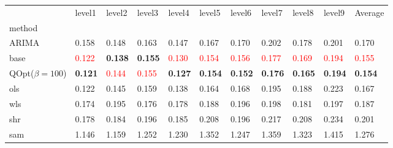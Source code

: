 \begin{tabular}{lllllllllll}
\toprule
 & level1 & level2 & level3 & level4 & level5 & level6 & level7 & level8 & level9 & Average \\
method &  &  &  &  &  &  &  &  &  &  \\
\midrule
ARIMA & 0.158 & 0.148 & 0.163 & 0.147 & 0.167 & 0.170 & 0.202 & 0.178 & 0.201 & 0.170 \\
base & \textcolor{red}{0.122} & \textbf{0.138} & \textbf{0.155} & \textcolor{red}{0.130} & \textcolor{red}{0.154} & \textcolor{red}{0.156} & \textcolor{red}{0.177} & \textcolor{red}{0.169} & \textcolor{red}{0.194} & \textcolor{red}{0.155} \\
\midrule
QOpt($\beta=100$) & \textbf{0.121} & \textcolor{red}{0.144} & \textcolor{red}{0.155} & \textbf{0.127} & \textbf{0.154} & \textbf{0.152} & \textbf{0.176} & \textbf{0.165} & \textbf{0.194} & \textbf{0.154} \\
ols & 0.122 & 0.145 & 0.159 & 0.138 & 0.164 & 0.168 & 0.195 & 0.188 & 0.223 & 0.167 \\
wls & 0.174 & 0.195 & 0.176 & 0.178 & 0.188 & 0.196 & 0.198 & 0.181 & 0.197 & 0.187 \\
shr & 0.178 & 0.184 & 0.196 & 0.185 & 0.208 & 0.196 & 0.217 & 0.208 & 0.234 & 0.201 \\
sam & 1.146 & 1.159 & 1.252 & 1.230 & 1.352 & 1.247 & 1.359 & 1.323 & 1.415 & 1.276 \\
\bottomrule
\end{tabular}